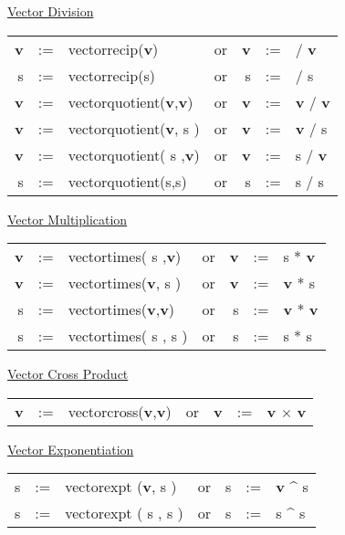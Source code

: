 \underline{Vector Division}\\
  
\begin{tabular}{rclcrcl}
\textbf{v} &:=& vectorrecip(\textbf{v})  &\textrm{or}& \textbf{v} &:=&  /
\textbf{v} \\
 s  &:=& vectorrecip(s)  &\textrm{or} &      s  &:=&  /       s  \\
\textbf{v} &:=& vectorquotient(\textbf{v},\textbf{v})  &\textrm{or }& \textbf{v} &:=&
\textbf{v} /  \textbf{v} \\
\textbf{v} &:=& vectorquotient(\textbf{v},    s  )  &\textrm{or }& \textbf{v} &:=&
\textbf{v} /     s    \\
\textbf{v} &:=& vectorquotient(   s   ,\textbf{v})  &\textrm{or }& \textbf{v} &:=&
   s    /  \textbf{v} \\
     s  &:=& vectorquotient(s,s)  &\textrm{or }&      s  &:=&  s / s

\end{tabular}

\underline{Vector Multiplication}\\
 
\begin{tabular}{rclcrcl}
\textbf{v} &:=& vectortimes(   s   ,\textbf{v})  &\textrm{or }& \textbf{v} &:=&
s    *  \textbf{v} \\
\textbf{v} &:=& vectortimes(\textbf{v},   s   )  &\textrm{or }& \textbf{v} &:=& \textbf{v}  *     s    \\
   s    &:=& vectortimes(\textbf{v},\textbf{v})  &\textrm{or }&    s    &:=& \textbf{v}  *  \textbf{v} \\
   s    &:=& vectortimes(   s   ,   s   )  &\textrm{or }&    s    &:=&
s    *     s
\end{tabular}

\underline{Vector Cross Product} \\
  
\begin{tabular}{rclcrcl}
\textbf{v} &:=& vectorcross(\textbf{v},\textbf{v})  &\textrm{or }& \textbf{v} &:=& \textbf{v} $\times$   \textbf{v}
\end{tabular}

\underline{Vector Exponentiation}\\
 
\begin{tabular}{rclcrcl}
   s    &:=& vectorexpt (\textbf{v},   s   )  &\textrm{or }&    s    &:=& \textbf{v}  \^{} s   \\
   s    &:=& vectorexpt (   s   ,   s   )  &\textrm{or }&    s    &:=&    s
     \^{} s
\end{tabular}

